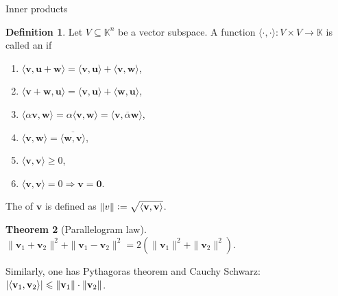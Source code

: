 \documentclass[dvipsnames]{beamer}
\theoremstyle{definition}
\newtheorem{thm}{Theorem}
\newtheorem{defn}[thm]{Definition}
\let\subset\subseteq
\let\ge\geqslant
\let\le\leqslant
\begin{document}
\begin{frame}{Inner products}
    \begin{defn}
        Let $V \subset \mathbb{K}^{n}$ be a vector subspace. \pause A function $\langle \cdot, \cdot \rangle : V \times V \to \mathbb{K}$ is called an  if \pause
        \begin{enumerate}[<+->]
            \item $\langle \mathbf{v}, \mathbf{u} + \mathbf{w}\rangle = \langle \mathbf{v}, \mathbf{u}\rangle + \langle \mathbf{v}, \mathbf{w}\rangle$,
            \item $\langle \mathbf{v} + \mathbf{w}, \mathbf{u}\rangle = \langle \mathbf{v}, \mathbf{u}\rangle + \langle \mathbf{w}, \mathbf{u}\rangle$,
            \item $\langle \alpha \mathbf{v}, \mathbf{w}\rangle = \alpha \langle \mathbf{v}, \mathbf{w}\rangle = \langle \mathbf{v}, \overline{\alpha} \mathbf{w}\rangle$,
            \item $\langle \mathbf{v}, \mathbf{w}\rangle = \overline{\langle \mathbf{w}, \mathbf{v}\rangle}$,
            \item $\langle \mathbf{v}, \mathbf{v}\rangle \ge 0$,
            \item $\langle \mathbf{v}, \mathbf{v}\rangle = 0 \Rightarrow \mathbf{v} = \mathbf{0}$.
        \end{enumerate} \pause

        The  of $\mathbf{v}$ is defined as $\|v\| \vcentcolon= \sqrt{\langle \mathbf{v}, \mathbf{v}\rangle}$.
    \end{defn} \pause

    \begin{thm}[Parallelogram law]
        $\|\mathbf{v}_{1} + \mathbf{v}_{2}\|^{2} + \|\mathbf{v}_{1} - \mathbf{v}_{2}\|^{2} = 2(\|\mathbf{v}_{1}\|^{2} + \|\mathbf{v}_{2}\|^{2})$.
    \end{thm} \pause
    Similarly, one has Pythagoras theorem and Cauchy Schwarz: $\md{\langle \mathbf{v}_{1}, \mathbf{v}_{2}\rangle} \le \|\mathbf{v}_{1}\| \cdot \|\mathbf{v}_{2}\|$.
\end{frame}
\end{document}
